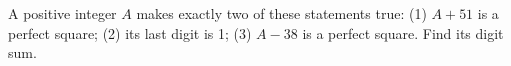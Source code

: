 A positive integer $A$ makes exactly two of these statements true: (1) $A+51$ is a perfect square; (2) its last digit is 1; (3) $A-38$ is a perfect square. Find its digit sum.

